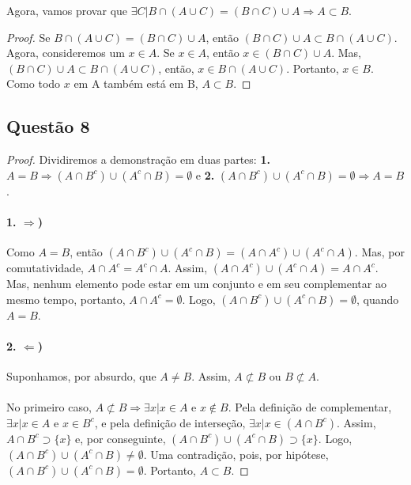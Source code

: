 \documentclass[9pt,twocolumn,a4paper]{article}
\begin{document}
    Agora, vamos provar que $\exists C | B \cap (A \cup C) = (B \cap C) \cup A \Rightarrow A \subset B$.
    \begin{proof}
    Se $B \cap (A \cup C) = (B \cap C) \cup A$, então $(B \cap C) \cup A \subset B \cap (A \cup C)$. Agora, consideremos um $x \in A$. Se $x \in A$, então $x \in (B \cap C) \cup A$. Mas, $(B \cap C) \cup A \subset B \cap (A \cup C)$, então, $x \in B \cap (A \cup C)$. Portanto, $x \in B$. Como todo $x$ em A também está em B, $A \subset B$.
    \end{proof}

    
    \subsection{Questão 8}
    \begin{proof}
    Dividiremos a demonstração em duas partes: \textbf{1.} $A = B \Rightarrow (A \cap B^c) \cup (A^c \cap B) = \emptyset$ e \textbf{2.} $(A \cap B^c) \cup (A^c \cap B) = \emptyset \Rightarrow A = B$.

    \paragraph{1. $\Rightarrow$)}
    Como $A = B$, então $(A \cap B^c) \cup (A^c \cap B) = (A \cap A^c) \cup (A^c \cap A)$. Mas, por comutatividade, $A \cap A^c = A^c \cap A$. Assim, $(A \cap A^c) \cup (A^c \cap A) = A \cap A^c$. Mas, nenhum elemento pode estar em um conjunto e em seu complementar ao mesmo tempo, portanto, $A \cap A^c = \emptyset$. Logo, $(A \cap B^c) \cup (A^c \cap B) = \emptyset$, quando $A = B$.

    \paragraph{2. $\Leftarrow$)}
    Suponhamos, por absurdo, que $A \not= B$. Assim, $A \not\subset B$ ou $B \not\subset A$.

    \paragraph{}
    No primeiro caso, $A \not\subset B \Rightarrow \exists x | x \in A$ e $x \not\in B$. Pela definição de complementar, $\exists x | x \in A$ e $x \in B^c$, e pela definição de interseção, $\exists x | x \in (A \cap B^c)$. Assim, $A \cap B^c \supset \{x\}$ e, por conseguinte, $(A \cap B^c) \cup (A^c \cap B) \supset \{x\}$. Logo, $(A \cap B^c) \cup (A^c \cap B) \not= \emptyset$. Uma contradição, pois, por hipótese, $(A \cap B^c) \cup (A^c \cap B) = \emptyset$. Portanto, $A \subset B$.


\end{proof}
\end{document}
